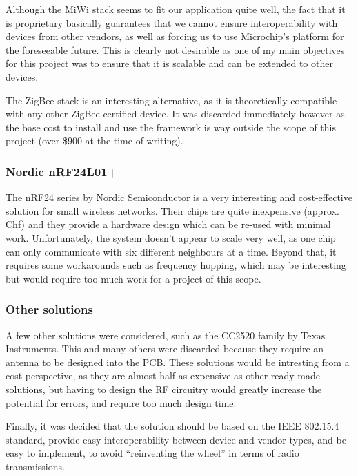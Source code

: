 Although the MiWi stack seems to fit our application quite well, the fact that
it is proprietary basically guarantees that we cannot ensure interoperability
with devices from other vendors, as well as forcing us to use Microchip's
platform for the foreseeable future. This is clearly not desirable as one of my
main objectives for this project was to ensure that it is scalable and can be
extended to other devices.

The ZigBee stack is an interesting alternative, as it is theoretically
compatible with any other ZigBee-certified device. It was discarded immediately
however as the base cost to install and use the framework is way outside the
scope of this project (over \$900 at the time of writing).

\subsubsection{Nordic nRF24L01+}

The nRF24 series by Nordic Semiconductor is a
very interesting and cost-effective solution for small wireless networks. Their
chips are quite inexpensive (approx. \unit[7]{Chf}) and they provide a hardware
design which can be re-used with minimal work. Unfortunately, the system doesn't
appear to scale very well, as one chip can only communicate with six different
neighbours at a time. Beyond that, it requires some workarounds such as
frequency hopping, which may be interesting but would require too much work for
a project of this scope.

\subsubsection{Other solutions}

A few other solutions were considered, such as the CC2520 family by Texas
Instruments. This and many others were discarded because
they require an antenna to be designed into the PCB. These solutions would be
intresting from a cost perspective, as they are almost half as expensive as
other ready-made solutions, but having to design the RF circuitry would greatly
increase the potential for errors, and require too much design time. 

Finally, it was decided that the solution should be based on the IEEE 802.15.4
standard, provide easy interoperability between device and vendor types, and be
easy to implement, to avoid ``reinventing the wheel'' in terms of radio
transmissions.

